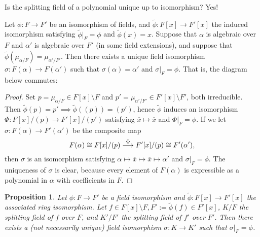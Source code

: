 \documentclass[11pt]{book}
\newcounter{counter}
\newtheorem{proposition}[counter]{Proposition}   \newtheorem{problem}[counter]{Problem}   \newtheorem*{proposition*}{Proposition}   \newtheorem*{lemma*}{Lemma}
\theoremstyle{definition}   \newtheorem{defn}[counter]{Definition} %
\newcommand{\ov}{\overline}   \newcommand{\wt}{\widetilde}
\newcommand{\bs}{\setminus}   \newcommand{\A}{\mathcal{A}}   \newcommand{\sy}{\textnormal{Syl}}   \newcommand{\size}[1]{\left| #1 \right|}
\DeclareMathOperator{\ra}{\rightarrow}   \DeclareMathOperator{\Poly}{\mathbf{P}}   \DeclareMathOperator{\spn}{\textnormal{span}}   \DeclareMathOperator{\aut}{\textnormal{Aut}}
\newcommand{\vs}{\vspace{8pt}}
\numberwithin{counter}{chapter}
\begin{document}
\vs 

\noindent {} Is the splitting field of a polynomial unique up to isomorphism? Yes! 

\vs

\begin{lemma}
Let $\phi : F \ra F'$ be an isomorphism of fields, and $\wt{\phi} : F[x] \ra F'[x]$ the induced isomorphism satisfying $\wt{\phi}|_F = \phi$ and $\wt{\phi}(x) = x$. Suppose that $\alpha $ is algebraic over $F$ and $\alpha'$ is algebraic over $F'$ (in some field extensions), and suppose that $\wt{\phi}(\mu_{\alpha/F}) = \mu_{\alpha'/F'}$. Then there exists a unique field isomorphism $\sigma : F(\alpha) \ra F(\alpha')$ such that $\sigma(\alpha) = \alpha'$ and $\sigma|_F = \phi$. That is, the diagram below commutes: 

\begin{center}
\end{center}
\end{lemma}

\begin{proof}
Set $p = \mu_{\alpha/F} \in F[x] \bs F$ and $p' = \mu_{\alpha'/F'} \in F'[x] \bs F'$, both irreducible. Then $\wt{\phi}(p) = p' \implies \wt{\phi}((p)) = (p')$, hence $\wt{\phi}$ induces an isomorphism $\Phi : F[x]/(p) \ra F'[x]/(p')$ satisfying $\ov{x} \mapsto \ov{x}$ and $\Phi|_F = \phi$. If we let $\sigma : F(\alpha) \ra F'(\alpha')$ be the composite map
	\[F(\alpha) \cong F[x]/(p) \overset{\Phi}{\longrightarrow} F'[x]/(p) \cong F'(\alpha'), \]
then $\sigma$ is an isomorphism satisfying $\alpha \mapsto \ov{x} \mapsto \ov{x} \mapsto \alpha'$ and $\sigma|_F = \phi$. The uniqueness of $\sigma$ is clear, because every element of $F(\alpha)$ is expressible as a polynomial in $\alpha$ with coefficients in $F$. 
\end{proof}

\vs

\begin{proposition}
Let $\phi : F \ra F'$ be a field isomorphism and $\wt{\phi} : F[x] \ra F'[x]$ the associated ring isomorphism. Let $f \in F[x] \bs F, F' := \wt{\phi}(f) \in F'[x]$, $K/F$ the splitting field of $f$ over $F$, and $K'/F'$ the splitting field of $f'$ over $F'$. Then there exists a (not necessarily unique) field isomorphism $\sigma : K \ra K'$ such that $\sigma|_F = \phi$. \qquad \qquad
{}
\end{proposition}
\end{document}

